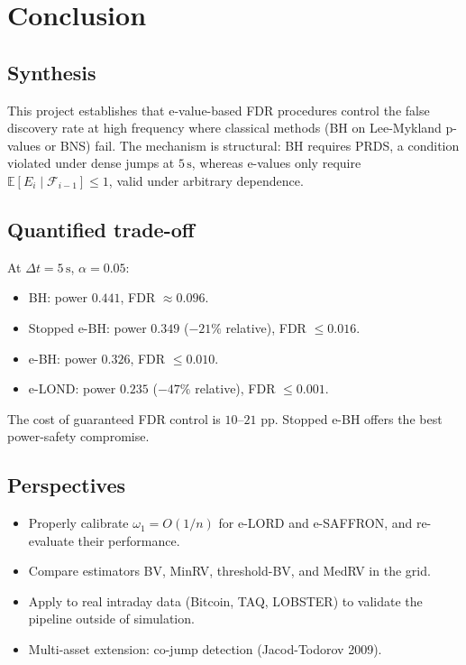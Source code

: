 \documentclass[11pt,a4paper]{article}
\theoremstyle{plain}
\theoremstyle{definition}
\theoremstyle{remark}
\newcommand{\E}{\mathbb{E}}
\begin{document}
\section{Conclusion}
\label{sec:conclusion}

\subsection{Synthesis}

This project establishes that e-value-based FDR procedures control the
false discovery rate at high frequency where classical methods (BH on
Lee-Mykland p-values or BNS) fail. The mechanism is structural: BH
requires PRDS, a condition violated under dense jumps at $5\,\mathrm{s}$,
whereas e-values only require $\E[E_i \mid \mathcal{F}_{i-1}] \le 1$,
valid under arbitrary dependence.

\subsection{Quantified trade-off}

At $\Delta t = 5\,\mathrm{s}$, $\alpha = 0.05$:
\begin{itemize}
  \item BH: power $0.441$, FDR $\approx 0.096$.
  \item Stopped e-BH: power $0.349$ ($-21\%$ relative), FDR $\le 0.016$.
  \item e-BH: power $0.326$, FDR $\le 0.010$.
  \item e-LOND: power $0.235$ ($-47\%$ relative), FDR $\le 0.001$.
\end{itemize}
The cost of guaranteed FDR control is $10$--$21$ pp. Stopped e-BH offers
the best power-safety compromise.

\subsection{Perspectives}

\begin{itemize}
  \item Properly calibrate $\omega_1 = O(1/n)$ for e-LORD and e-SAFFRON,
    and re-evaluate their performance.
  \item Compare estimators BV, MinRV, threshold-BV, and MedRV in the grid.
  \item Apply to real intraday data (Bitcoin, TAQ, LOBSTER) to validate
    the pipeline outside of simulation.
  \item Multi-asset extension: co-jump detection (Jacod-Todorov 2009).
\end{itemize}
\end{document}
